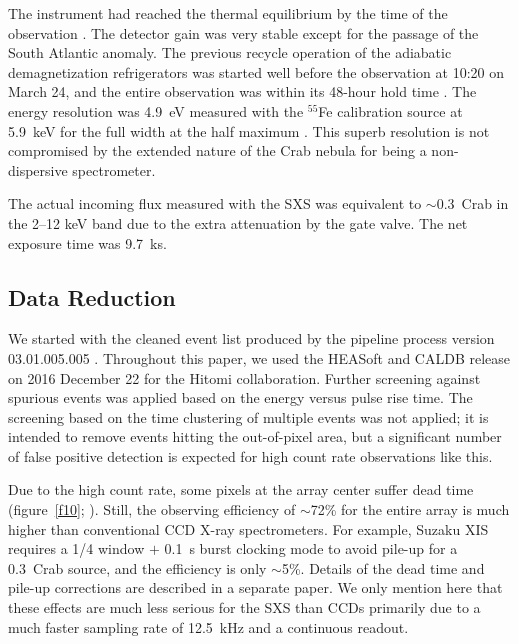\documentclass[]{pasj01}
\begin{document}
The instrument had reached the thermal equilibrium by the time of the observation
\citep{fujimoto16,noda16}. The detector gain was very stable except for the passage of
the South Atlantic anomaly. The previous recycle operation of the adiabatic
demagnetization refrigerators was started well before the observation at 10:20 on March
24, and the entire observation was within its 48-hour hold time \citep{shirron16}. The
energy resolution was 4.9~eV measured with the $^{55}$Fe calibration source at 5.9~keV
for the full width at the half maximum \citep{porter16,kilbourne16b,leutenegger16}. This
superb resolution is not compromised by the extended nature of the Crab nebula for being
a non-dispersive spectrometer.

The actual incoming flux measured with the SXS was equivalent to $\sim$0.3~Crab in the
2--12 keV band due to the extra attenuation by the gate valve. The net exposure time was
9.7~ks.



\subsection{Data Reduction}\label{s2-2}
We started with the cleaned event list produced by the pipeline process version
03.01.005.005 \citep{angelini16}. Throughout this paper, we used the HEASoft and CALDB
release on 2016 December 22 for the Hitomi collaboration. Further screening against
spurious events was applied based on the energy versus pulse rise time. The screening
based on the time clustering of multiple events was not applied; it is intended to
remove events hitting the out-of-pixel area, but a significant number of false positive detection is
expected for high count rate observations like this.

Due to the high count rate, some pixels at the array center suffer dead time
(figure~\ref{f10}; \cite{ishisaki16}). Still, the observing efficiency of $\sim$72\% for
the entire array is much higher than conventional CCD X-ray spectrometers. For example,
Suzaku XIS \citep{koyama07} requires a 1/4 window $+$ 0.1~s burst clocking mode to avoid
pile-up for a 0.3~Crab source, and the efficiency is only $\sim$5\%. Details of the dead
time and pile-up corrections are described in a separate paper. We only mention here
that these effects are much less serious for the SXS than CCDs primarily due to a much
faster sampling rate of 12.5~kHz and a continuous readout.
\end{document}
